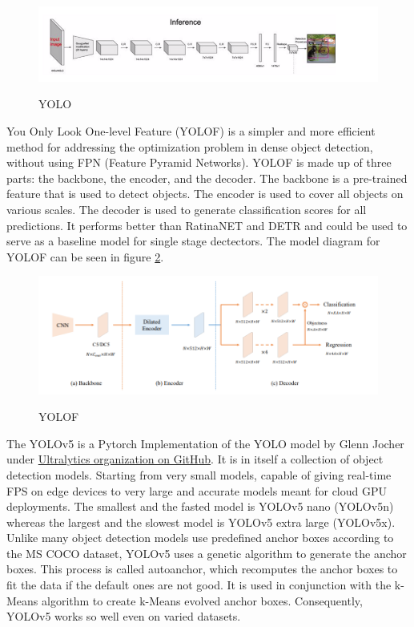\documentclass[conference]{IEEEtran}
\begin{document}
\begin{figure}[h]
    \centering
    \includegraphics[width=\linewidth]{3667085056-5c21a39288e97_articlex.png}\\
    \caption{YOLO}
    \label{fig7}
\end{figure}

You Only Look One-level Feature (YOLOF) \cite{5} is a simpler and more efficient method for addressing the optimization problem in dense object detection, without using FPN (Feature Pyramid Networks). YOLOF is made up of three parts: the backbone, the encoder, and the decoder. The backbone is a pre-trained feature that is used to detect objects. The encoder is used to cover all objects on various scales. The decoder is used to generate classification scores for all predictions. It performs better than RatinaNET and DETR and could be used to serve as a baseline model for single stage dectectors. The model diagram for YOLOF can be seen in figure \ref{fig6}.
\begin{figure}[h]
    \centering
    \includegraphics[width=0.7\linewidth]{5..png}\\
    \caption{YOLOF}
    \label{fig6}
\end{figure}

The YOLOv5 \cite{glenn_jocher_2021_5563715} is a Pytorch Implementation of the YOLO model by Glenn Jocher under 
\href{https://github.com/ultralytics}{Ultralytics organization on GitHub}. It is in itself a collection of object detection models. Starting from very small models, capable of giving real-time FPS on edge devices to very large and accurate models meant for cloud GPU deployments. The smallest and the fasted model is YOLOv5 nano (YOLOv5n) whereas the largest and the slowest model is YOLOv5 extra large (YOLOv5x). Unlike many object detection models use predefined anchor boxes according to the MS COCO dataset, YOLOv5 uses a genetic algorithm to generate the anchor boxes. This process is called autoanchor, which recomputes the anchor boxes to fit the data if the default ones are not good. It is used in conjunction with the k-Means algorithm to create k-Means evolved anchor boxes. Consequently, YOLOv5 works so well even on varied datasets.
\end{document}
